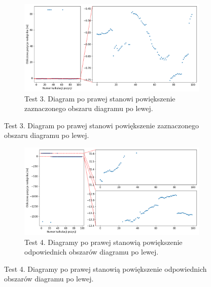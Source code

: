 \begin{figure}[H]
    \ContinuedFloat\centering
    \begin{subfigure}{\textwidth}\label{fig:position_2}
        \centering
        \includegraphics[width=\linewidth]{pics/position/position_2.png}
        \caption{Test 3. Diagram po prawej stanowi powiększenie zaznaczonego obszaru diagramu po lewej.}
    \end{subfigure}
\end{figure}
\begin{figure}[H]
    \ContinuedFloat\centering
    \begin{subfigure}{\textwidth}\label{fig:position_3}
        \centering
        \includegraphics[width=\linewidth]{pics/position/position_3.png}
        \caption{Test 4. Diagramy po prawej stanowią powiększenie odpowiednich obszarów diagramu po lewej.}
    \end{subfigure}
\end{figure}
